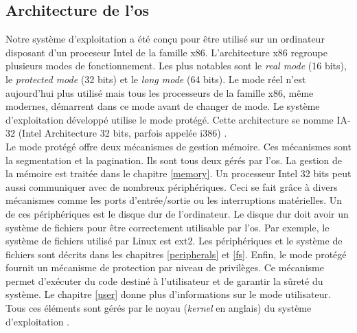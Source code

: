 
\subsection{Architecture de l'\acrshort{os}}
Notre système d'exploitation a été conçu pour être utilisé sur un ordinateur
disposant d'un proceseur Intel de la famille x86. L'architecture x86 regroupe
plusieurs modes de fonctionnement. Les plus notables sont le \textit{real mode}
(16 bits), le \textit{protected mode} (32 bits) et le \textit{long mode} (64 bits).
Le mode réel n'est aujourd'hui plus utilisé mais tous les processeurs de la
famille x86, même modernes, démarrent dans ce mode avant de changer de mode.
Le système d'exploitation développé utilise le mode protégé. Cette architecture
se nomme \acrshort{IA-32} (Intel Architecture 32 bits, parfois appelée i386)
\cite{ref42}. \\

Le mode protégé offre deux mécanismes de gestion mémoire.
Ces mécanismes sont la segmentation et la pagination. Ils sont tous deux gérés
par l'\acrshort{os}. La gestion de la mémoire est traitée dans le chapitre \ref{memory}.
Un processeur Intel 32 bits peut aussi communiquer avec de nombreux périphériques.
Ceci se fait grâce à divers mécanismes comme les ports d'entrée/sortie ou
les interruptions matérielles. Un de ces périphériques est le disque dur de
l'ordinateur. Le disque dur doit avoir un système de fichiers pour être correctement
utilisable par l'\acrshort{os}. Par exemple, le système de fichiers utilisé
par Linux est ext2. Les périphériques et le système de fichiers sont décrits
dans les chapitres \ref{peripherals} et \ref{fs}. Enfin, le mode protégé fournit
un mécanisme de protection par niveau de privilèges. Ce mécanisme permet d'exécuter
du code destiné à l'utilisateur et de garantir la sûreté du système. Le chapitre
\ref{user} donne plus d'informations sur le mode utilisateur. Tous ces éléments
sont gérés par le noyau (\textit{kernel} en anglais) du système d'exploitation \cite{ref42}.

